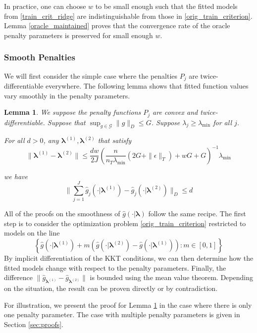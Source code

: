 \documentclass[12pt]{article}
\newtheorem{lemma}{Lemma}
\begin{document}
In practice, one can choose $w$ to be small enough such that the fitted models from \eqref{train_crit_ridge} are indistinguishable from those in \eqref{orig_train_criterion}. Lemma \ref{oracle_maintained} proves that the convergence rate of the oracle penalty parameters is preserved for small enough $w$.

\subsubsection{Smooth Penalties}
We will first consider the simple case where the penalties $P_j$ are twice-differentiable everywhere. The following lemma shows that fitted function values vary smoothly in the penalty parameters. 

\begin{lemma}
\label{lemma:smooth}
We suppose the penalty functions $P_{j}$ are convex and twice-differentiable.
Suppose that $\sup_{g\in\mathcal{G}}\|g\|_{D}\le G$.
Suppose $\lambda_j \ge \lambda_{\min}$ for all $j$.

For all $d>0$, any $\boldsymbol \lambda^{(1)}, \boldsymbol \lambda^{(2)}$ that satisfy 
\[
\|\boldsymbol \lambda^{(1)}- \boldsymbol \lambda^{(2)}\|\le\frac{dw}{2J}\left(\frac{n}{n_T \lambda_{\min} }\left(2G+\|\epsilon\|_{T}\right)+wG+G\right)^{-1}\lambda_{\min}
\]

we have
\[
\|\sum_{j=1}^{J}\hat{g}_{j}(\cdot| \boldsymbol \lambda^{(1)})-\hat{g}_{j}(\cdot| \boldsymbol \lambda^{(2)})\|_{D}\le d
\]
\end{lemma}

All of the proofs on the smoothness of $\hat{g}(\cdot | \boldsymbol \lambda)$ follow the same recipe. The first step is to consider the optimization problem \eqref{orig_train_criterion} restricted to models on the line
\begin{equation}
\left \{ \hat{g}(\cdot |\boldsymbol \lambda^{(1)}) + m \left (\hat{g}(\cdot |\boldsymbol \lambda^{(2)})  - \hat{g}(\cdot |\boldsymbol \lambda^{(1)}) \right ) : m \in [0,1] \right \}
\end{equation}
By implicit differentiation of the KKT conditions, we can then determine how the fitted models change with respect to the penalty parameters. Finally, the difference $\| \hat{g}_{\boldsymbol \lambda^{(1)}} -  \hat{g}_{\boldsymbol \lambda^{(2)}} \|$ is bounded using the mean value theorem. Depending on the situation, the result can be proven directly or by contradiction.

For illustration, we present the proof for Lemma \ref{lemma:smooth} in the case where there is only one penalty parameter. The case with multiple penalty parameters is given in Section \ref{sec:proofs}.
\end{document}
